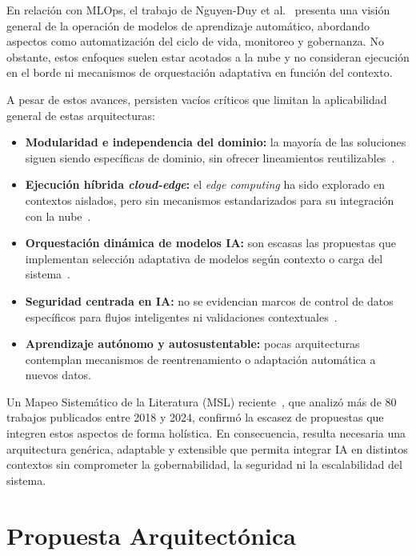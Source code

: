 \documentclass[a4paper]{llncs}
\begin{document}
En relación con MLOps, el trabajo de Nguyen-Duy et al.~\cite{nguyenduy2022mlops} presenta una visión general de la operación de modelos de aprendizaje automático, abordando aspectos como automatización del ciclo de vida, monitoreo y gobernanza. No obstante, estos enfoques suelen estar acotados a la nube y no consideran ejecución en el borde ni mecanismos de orquestación adaptativa en función del contexto.

A pesar de estos avances, persisten vacíos críticos que limitan la aplicabilidad general de estas arquitecturas:

\begin{itemize}
  \item \textbf{Modularidad e independencia del dominio:} la mayoría de las soluciones siguen siendo específicas de dominio, sin ofrecer lineamientos reutilizables~\cite{arora2022modular}.
  \item \textbf{Ejecución híbrida \textit{cloud-edge}:} el \textit{edge computing} ha sido explorado en contextos aislados, pero sin mecanismos estandarizados para su integración con la nube~\cite{satyanarayanan2017emergence}.
  \item \textbf{Orquestación dinámica de modelos IA:} son escasas las propuestas que implementan selección adaptativa de modelos según contexto o carga del sistema~\cite{deng2024orchestrated}.
  \item \textbf{Seguridad centrada en IA:} no se evidencian marcos de control de datos específicos para flujos inteligentes ni validaciones contextuales~\cite{yang2023zerotrust}.
  \item \textbf{Aprendizaje autónomo y autosustentable:} pocas arquitecturas contemplan mecanismos de reentrenamiento o adaptación automática a nuevos datos.
\end{itemize}

Un Mapeo Sistemático de la Literatura (MSL) reciente~\cite{chayle2024msl}, que analizó más de 80 trabajos publicados entre 2018 y 2024, confirmó la escasez de propuestas que integren estos aspectos de forma holística. En consecuencia, resulta necesaria una arquitectura genérica, adaptable y extensible que permita integrar IA en distintos contextos sin comprometer la gobernabilidad, la seguridad ni la escalabilidad del sistema.






\section{Propuesta Arquitectónica}
\end{document}
